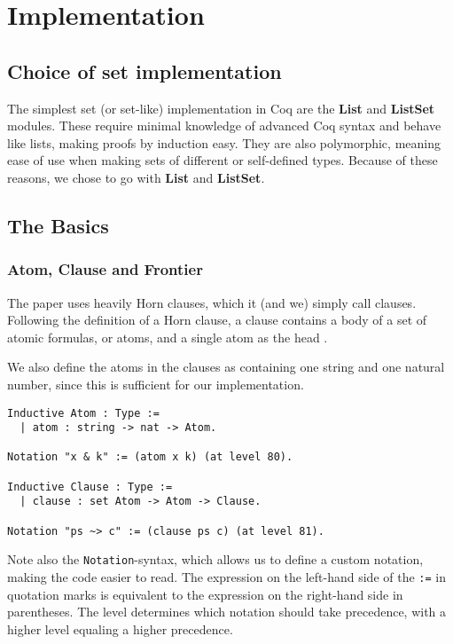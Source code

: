 \chapter{Implementation}

\section{Choice of set implementation}

The simplest set (or set-like) implementation in Coq are the \textbf{List} and \textbf{ListSet} modules.
These require minimal knowledge of advanced Coq syntax and behave like lists, making proofs by induction easy.
They are also polymorphic, meaning ease of use when making sets of different or self-defined types.
Because of these reasons, we chose to go with \textbf{List} and \textbf{ListSet}.

\section{The Basics}
\subsection{Atom, Clause and Frontier}

The paper \cite{mbezem} uses heavily Horn clauses, which it (and we) simply call clauses.
Following the definition of a Horn clause, a clause contains a body of a set of atomic formulas,
or atoms, and a single atom as the head \cite{halbert}.

We also define the atoms in the clauses as containing one string and one natural number,
since this is sufficient for our implementation.

\begin{minipage}{\linewidth}
\begin{lstlisting}[language=Coq, label={lst:atom_clause_def}, caption={Def. of \lstinline{Atom} and \lstinline{Clause} in Coq}]
Inductive Atom : Type :=
  | atom : string -> nat -> Atom.

Notation "x & k" := (atom x k) (at level 80).

Inductive Clause : Type :=
  | clause : set Atom -> Atom -> Clause.

Notation "ps ~> c" := (clause ps c) (at level 81).
\end{lstlisting}
\end{minipage}

Note also the \lstinline{Notation}-syntax, which allows us to define a custom notation,
making the code easier to read. The expression on the left-hand side of the \lstinline{:=} in quotation marks
is equivalent to the expression on the right-hand side in parentheses.
The level determines which notation should take precedence, with a higher level equaling a higher precedence.

